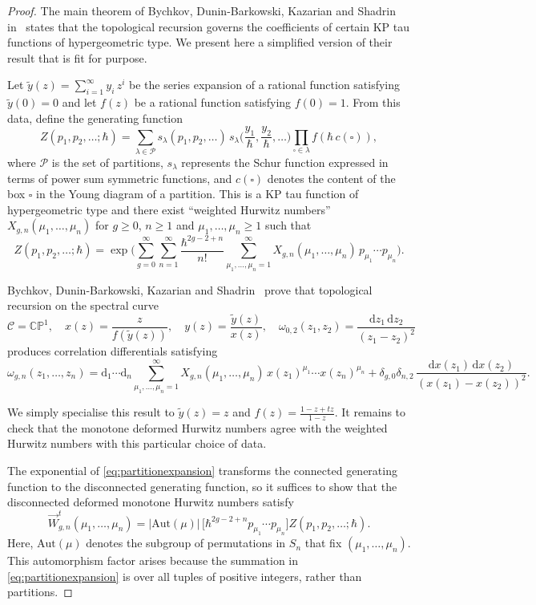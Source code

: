 \documentclass[a4paper]{article}
\theoremstyle{plain}
\numberwithin{theorem}{section}
\theoremstyle{definition}
\theoremstyle{remark}
\newcommand{\dd}{\mathrm{d}}
\newcommand{\h}{\hbar}
\renewcommand{\geq}{\geqslant}
\newcommand{\dHN}[3]{\vec{W}^t_{#1,#2}(#3)}
\begin{document}
\begin{proof}
The main theorem of Bychkov, Dunin-Barkowski, Kazarian and Shadrin in~\cite{BDKS21} states that the topological recursion governs the coefficients of certain KP tau functions of hypergeometric type. We present here a simplified version of their result that is fit for purpose.


Let $\tilde{y}(z) = \sum_{i=1}^\infty y_i \, z^i$ be the series expansion of a rational function satisfying $\tilde{y}(0) = 0$ and let $f(z)$ be a rational function satisfying $f(0) = 1$. From this data, define the generating function
\[
Z(p_1, p_2, \ldots; \h) = \sum_{\lambda \in \mathcal{P}} s_\lambda(p_1, p_2, \ldots) \, s_\lambda \Big( \frac{y_1}{\h}, \frac{y_2}{\h}, \ldots \Big) \prod_{\square \in \lambda} f(\h \, c(\square)),
\]
where $\mathcal{P}$ is the set of partitions, $s_\lambda$ represents the Schur function expressed in terms of power sum symmetric functions, and $c(\square)$ denotes the content of the box $\square$ in the Young diagram of a partition. This is a KP tau function of hypergeometric type and there exist ``weighted Hurwitz numbers'' $X_{g,n}(\mu_1, \ldots, \mu_n)$ for $g \geq 0$, $n \geq 1$ and $\mu_1, \ldots, \mu_n \geq 1$ such that
\begin{equation} \label{eq:partitionexpansion}
Z(p_1, p_2, \ldots; \h) = \exp \bigg( \sum_{g=0}^\infty \sum_{n=1}^\infty \frac{\h^{2g-2+n}}{n!} \sum_{\mu_1, \ldots, \mu_n=1}^\infty X_{g,n}(\mu_1, \ldots, \mu_n) \, p_{\mu_1} \cdots p_{\mu_n} \bigg).
\end{equation}


Bychkov, Dunin-Barkowski, Kazarian and Shadrin~\cite{BDKS21} prove that topological recursion on the spectral curve
\[
\mathcal{C} = \mathbb{CP}^1, \quad x(z) = \frac{z}{f(\tilde{y}(z))}, \quad y(z) = \frac{\tilde{y}(z)}{x(z)}, \quad \omega_{0,2}(z_1, z_2) = \frac{\dd z_1 \, \dd z_2}{(z_1 - z_2)^2}
\]
produces correlation differentials satisfying
\[
\omega_{g,n}(z_1, \ldots, z_n) = \dd_1 \cdots \dd_n \sum_{\mu_1, \ldots, \mu_n=1}^{\infty} X_{g,n}(\mu_1, \ldots, \mu_n) \, x(z_1)^{\mu_1} \cdots x(z_n)^{\mu_n} + \delta_{g,0} \delta_{n,2} \, \frac{\dd x(z_1) \, \dd x(z_2)}{\left( x(z_1) - x(z_2) \right)^2}.
\]


We simply specialise this result to $\tilde{y}(z) = z$ and $f(z) = \frac{1-z+tz}{1-z}$. It remains to check that the monotone deformed Hurwitz numbers agree with the weighted Hurwitz numbers with this particular choice of data.


The exponential of \cref{eq:partitionexpansion} transforms the connected generating function to the disconnected generating function, so it suffices to show that the disconnected deformed monotone Hurwitz numbers satisfy
\[
\dHN{g}{n}{\mu_1, \ldots, \mu_n} = |\mathrm{Aut}(\mu)| \, \big[ \h^{2g-2+n} p_{\mu_1} \cdots p_{\mu_n} \big] Z(p_1, p_2, \ldots; \h).
\]
Here, $\mathrm{Aut}(\mu)$ denotes the subgroup of permutations in $S_n$ that fix $(\mu_1, \ldots, \mu_n)$. This automorphism factor arises because the summation in \cref{eq:partitionexpansion} is over all tuples of positive integers, rather than partitions.



\end{proof}
\end{document}
